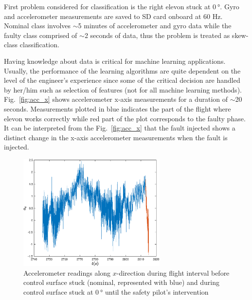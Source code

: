 First problem considered for classification is the right elevon stuck at $\SI{0}{\degree}$.
Gyro and accelerometer measurements are saved to SD card onboard at 60 Hz. 
Nominal class involves $\sim$5 minutes of accelerometer and gyro data while the faulty class comprised of $\sim$2 seconds of data, thus the problem is treated as skew-class classification. 

Having knowledge about data is critical for machine learning applications. 
Usually, the performance of the learning algorithms are quite dependent on the level of the engineer's experience since some of the critical decision are handled by her/him such as selection of features (not for all machine learning methods).
Fig.~\ref{fig:acc_x} shows accelerometer x-axis measurements for a duration of $\sim$20 seconds. 
Measurements plotted in blue indicates the part of the flight where elevon works correctly while red part of the plot corresponds to the faulty phase. 
It can be interpreted from the Fig.~\ref{fig:acc_x} that the fault injected shows a distinct change in the x-axis accelerometer measurements when the fault is injected. 



\begin{figure}
\begin{center}
\includegraphics[width=0.66\textwidth]{figures/acc_x_evenLongerNominal}    %
\caption{Accelerometer readings along $x$-direction during flight interval before control surface stuck (nominal, represented with blue) and during control surface stuck at  $\SI{0}{\degree}$ until the safety pilot's intervention} 
\label{fig:acc_x_evenLongerNominal}
\end{center}
\end{figure}


